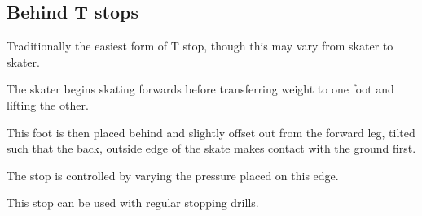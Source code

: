 \subsection*{Behind T stops}
\label{sec:stopping/t_stops/behind}

Traditionally the easiest form of T stop, though this may vary from skater to skater.

The skater begins skating forwards before transferring weight to one foot and lifting the other.

This foot is then placed behind and slightly offset out from the forward leg, tilted such that the back, outside edge of the skate makes contact with the ground first.

The stop is controlled by varying the pressure placed on this edge.


This stop can be used with regular stopping drills.


